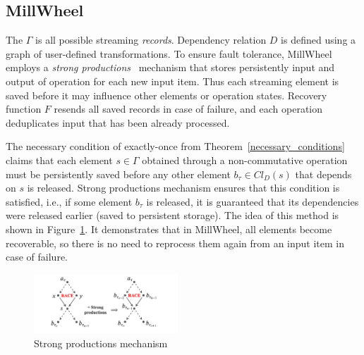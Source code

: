 
\subsection{MillWheel}

 The $\Gamma$ is all possible streaming {\em records}. Dependency relation $D$ is defined using a graph of user-defined transformations. 
 To ensure fault tolerance,   MillWheel employs a {\em strong productions}~\cite{Akidau:2013:MFS:2536222.2536229}   mechanism that stores persistently input and output of operation for each new input item.
 Thus each streaming element is saved before it may influence other elements or operation states. 
 Recovery function $F$ resends all saved records in case of failure, and each operation deduplicates input that has been already processed.

The necessary condition of exactly-once from Theorem~\ref{necessary_conditions} claims that each element $s \in \Gamma$ obtained through a non-commutative operation must be persistently saved before any other element $b_{\tau} \in Cl_D(s)$ that depends on $s$ is released. Strong productions mechanism ensures that this condition is satisfied, i.e., if some element $b_\tau$ is released, it is guaranteed that its dependencies were released earlier (saved to persistent storage). The idea of this method is shown in Figure~\ref{millwheel}. It demonstrates that in MillWheel, all elements become recoverable, so there is no need to reprocess them again from an input item in case of failure. 

\begin{figure}[htbp]
  \centering
  \includegraphics[width=0.48\textwidth]{Chapters/DeliveryGuarantees/pics/millwheel.png}
  \caption{Strong productions mechanism}
  \label{millwheel}
\end{figure}

